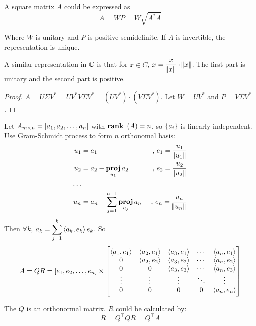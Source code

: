 \begin{theorem}
    A square matrix $A$ could be expressed as 
    \begin{equation}
        A = WP = W \sqrt{A^*A}
    \end{equation}
    
    Where $W$ is unitary and $P$ is positive semidefinite. If $A$ is invertible, the representation is unique. 
    
    A similar representation in $\complexnumber$ is that for $x \in C$, $\displaystyle x = \frac{x}{\norm{x}} \cdot \norm{x}$. The first part is unitary and the second part is positive.
\end{theorem}
\begin{proof}
    $A = U\Sigma V^* = U V^* V \Sigma V^* = (U V^*) \cdot (V \Sigma V^*)$. Let $W = U V^*$ and $P = V \Sigma V^*$.
\end{proof}


\begin{theorem}
    Let $A_{m \times n} = \rowvector{a_1, a_2, \dots, a_n}$ with $\rank{A} = n$, so $\set{a_i}$ is linearly independent. Use Gram-Schmidt process to form $n$ orthonomal basis:
    \begin{equation*}
        \begin{aligned}
            u_1 &= a_1 & \text{ , } e_1 = \frac{u_1}{\norm{u_1}} \\
            u_2 &= a_2 - \projection{a_2}{u_1} & \text{ , } e_2 = \frac{u_2}{\norm{u_2}} \\
            \dots \\
            u_n &= a_n - \sum_{j=1}^{n-1} \projection{a_n}{u_j} & \text{ , } e_n = \frac{u_n}{\norm{u_n}} 
        \end{aligned}
    \end{equation*}
    Then $\forall k$, $\displaystyle a_k = \sum_{j=1}^k \innerproduct{a_k}{e_k} e_k$. So
    \begin{equation}
        A = QR = [e_1, e_2, \dots, e_n] \times \begin{bmatrix}
            \innerproduct{a_1}{e_1} & \innerproduct{a_2}{e_1} & \innerproduct{a_3}{e_1} & \cdots & \innerproduct{a_n}{e_1}\\
            0 & \innerproduct{a_2}{e_2} & \innerproduct{a_3}{e_2} & \cdots & \innerproduct{a_n}{e_2}\\
            0 & 0 & \innerproduct{a_3}{e_3} & \cdots & \innerproduct{a_n}{e_3} \\            
            \vdots & \vdots & \vdots & \ddots & \vdots \\
            0 & 0 & 0 & 0 & \innerproduct{a_n}{e_n}
        \end{bmatrix}
    \end{equation}
    
    The $Q$ is an orthonormal matrix. $R$ could be calculated by:
    \begin{equation}
        R = Q^\top Q R = Q^\top A
    \end{equation}
\end{theorem}


